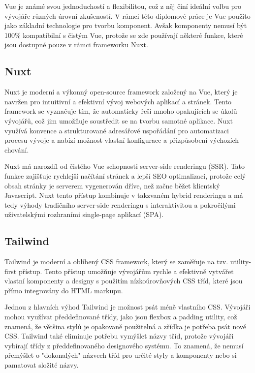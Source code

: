 Vue je známé svou jednoduchostí a flexibilitou, což z něj činí ideální volbu pro vývojáře různých úrovní zkušeností. V rámci této diplomové práce je Vue použito jako základní technologie pro tvorbu komponent. Avšak komponenty nemusí být 100\% kompatibilní s čistým Vue, protože se zde používají některé funkce, které jsou dostupné pouze v rámci frameworku Nuxt.

\subsection{Nuxt}
Nuxt je moderní a výkonný open-source framework založený na Vue, který je navržen pro intuitivní a efektivní vývoj webových aplikací a stránek. Tento framework se vyznačuje tím, že automaticky řeší mnoho opakujících se úkolů vývojářů, což jim umožňuje soustředit se na tvorbu samotné aplikace. Nuxt využívá konvence a strukturované adresářové uspořádání pro automatizaci procesu vývoje a nabízí možnost vlastní konfigurace a přizpůsobení výchozích chování.

Nuxt má narozdíl od čistého Vue schopnosti server-side renderingu (SSR). Tato funkce zajišťuje rychlejší načítání stránek a lepší SEO optimalizaci, protože celý obsah stránky je serverem vygenerován dříve, než začne běžet klientský Javascript. Nuxt tento přístup kombinuje v takzvaném hybrid renderingu a má tedy výhody tradičního server-side renderingu s interaktivitou a pokročilými uživatelskými rozhraními single-page aplikací (SPA). \cite{NuxtRenderingModes}

\subsection{Tailwind}
Tailwind je moderní a oblíbený CSS framework, který se zaměřuje na tzv. utility-first přístup. Tento přístup umožňuje vývojářům rychle a efektivně vytvářet vlastní komponenty a designy s použitím nízkoúrovňových CSS tříd, které jsou přímo integrovány do HTML markupu.

Jednou z hlavních výhod Tailwind je možnost psát méně vlastního CSS. Vývojáři mohou využívat předdefinované třídy, jako jsou flexbox a padding utility, což znamená, že většina stylů je opakovaně použitelná a zřídka je potřeba psát nové CSS. Tailwind také eliminuje potřebu vymýšlet názvy tříd, protože vývojáři vybírají třídy z předdefinovaného designového systému. To znamená, že nemusí přemýšlet o "dokonalých" názvech tříd pro určité styly a komponenty nebo si pamatovat složité názvy. \cite{TailwindUtilityFirst}

